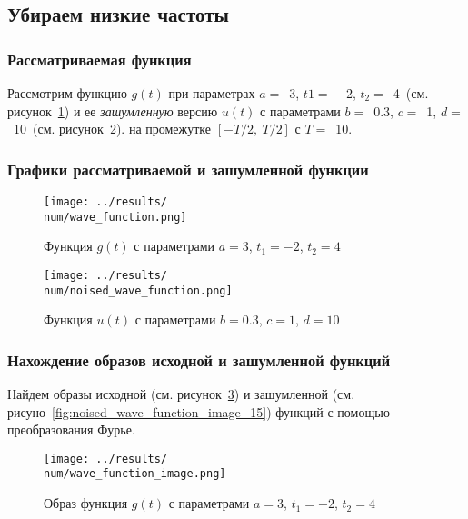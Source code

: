 \subsection{Убираем низкие частоты}

\def\num{15}
\def\a{3}
\def\from{-2}
\def\to{4}
\def\b{0.3}
\def\c{1}
\def\d{10}
\def\T{10}
\def\imageclip{8}


\subsubsection{Рассматриваемая функция}
Рассмотрим функцию $g(t)$ при параметрах $a=$~\a, $t1 =$~ \from, $t_2 =$~\to ~(см. рисунок~\ref{fig:wave_function_\num}) 
и ее \textit{зашумленную} версию $u(t)$ с параметрами $b =$~\b, $c =$~\c, $d =$~\d ~(см. рисунок~\ref{fig:noised_wave_function_\num}).
на промежутке $[-T/2,~T/2]$ с $T =$~\T.

\FloatBarrier
\subsubsection{Графики рассматриваемой и зашумленной функции}
\begin{figure}[ht!]
    \centering
    \texttt{[image: ../results/\\num/wave\_function.png]}
    \caption{Функция $g(t)$ с параметрами $a = \a$, $t_1 = \from$, $t_2 = \to$}
    \label{fig:wave_function_\num}
\end{figure}

\begin{figure}[ht!]
    \centering
    \texttt{[image: ../results/\\num/noised\_wave\_function.png]}
    \caption{Функция $u(t)$ с параметрами $b = \b$, $c = \c$, $d = \d$}
    \label{fig:noised_wave_function_\num}
\end{figure}

\FloatBarrier
\subsubsection{Нахождение образов исходной и зашумленной функций}
Найдем образы исходной (см. рисунок~\ref{fig:wave_function_image_\num}) 
и зашумленной (см. рисуно~\ref{fig:noised_wave_function_image_\num}) функций с помощью преобразования Фурье. 

\begin{figure}[ht!]
    \centering
    \texttt{[image: ../results/\\num/wave\_function\_image.png]}
    \caption{Образ функция $g(t)$ с параметрами $a = \a$, $t_1 = \from$, $t_2 = \to$}
    \label{fig:wave_function_image_\num}
\end{figure}

